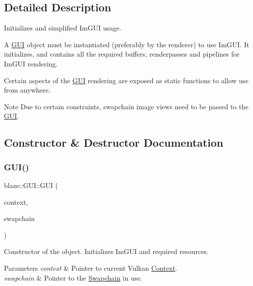 \subsection{Detailed Description}
Initializes and simplified Im\+G\+UI usage. 

A \hyperlink{classblaze_1_1GUI}{G\+UI} object must be instantiated (preferably by the renderer) to use Im\+G\+UI. It initializes, and contains all the required buffers, renderpasses and pipelines for Im\+G\+UI rendering.

Certain aspects of the \hyperlink{classblaze_1_1GUI}{G\+UI} rendering are exposed as static functions to allow use from anywhere.

\begin{DoxyNote}{Note}
Due to certain constraints, swapchain image views need to be passed to the \hyperlink{classblaze_1_1GUI}{G\+UI}. 
\end{DoxyNote}


\subsection{Constructor \& Destructor Documentation}
\mbox{\label{classblaze_1_1GUI_aa23a611841b303e39ff7eddd5295dc52}} 
\subsubsection{\texorpdfstring{G\+U\+I()}{GUI()}\hspace{0.1cm}{\footnotesize\ttfamily [1/2]}}
{\footnotesize\ttfamily blaze\+::\+G\+U\+I\+::\+G\+UI (\begin{DoxyParamCaption}\item[{const \hyperlink{classblaze_1_1Context}{Context} $\ast$}]{context,  }\item[{const \hyperlink{classblaze_1_1Swapchain}{Swapchain} $\ast$}]{swapchain }\end{DoxyParamCaption})\hspace{0.3cm}{\ttfamily [noexcept]}}



Constructor of the object. Initializes Im\+G\+UI and required resources. 


\begin{DoxyParams}{Parameters}
{\em context} & Pointer to current Vulkan \hyperlink{classblaze_1_1Context}{Context}. \\
\hline
{\em swapchain} & Pointer to the \hyperlink{classblaze_1_1Swapchain}{Swapchain} in use. \\
\hline
\end{DoxyParams}
\mbox{\label{classblaze_1_1GUI_ae5c00772ef74fcee43be1aa3b9dc21b1}} 
